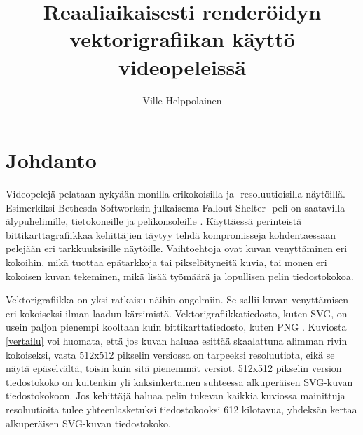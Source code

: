 \documentclass[utf8,bachelor]{gradu3}
\begin{document}
\title{Reaaliaikaisesti renderöidyn vektorigrafiikan käyttö videopeleissä}


\author{Ville Helppolainen}

\maketitle

\mainmatter


\chapter{Johdanto}

Videopelejä pelataan nykyään monilla erikokoisilla ja -resoluutioisilla näytöillä. Esimerkiksi Bethesda Softworksin julkaisema Fallout Shelter -peli on saatavilla älypuhelimille, tietokoneille ja pelikonsoleille \parencite{RefWorks:doc:5bd6d887e4b0a1f99c62e6de}. Käyttäessä perinteistä bittikarttagrafiikkaa kehittäjien täytyy tehdä kompromisseja kohdentaessaan pelejään eri tarkkuuksisille näytöille. Vaihtoehtoja ovat kuvan venyttäminen eri kokoihin, mikä tuottaa epätarkkoja tai pikselöityneitä kuvia, tai monen eri kokoisen kuvan tekeminen, mikä lisää työmäärä ja lopullisen pelin tiedostokokoa. \parencite{RefWorks:doc:5bd8319de4b03ae5c9b276b8}

Vektorigrafiikka on yksi ratkaisu näihin ongelmiin. Se sallii kuvan venyttämisen eri kokoiseksi ilman laadun kärsimistä. Vektorigrafiikkatiedosto, kuten SVG, on usein paljon pienempi kooltaan kuin bittikarttatiedosto, kuten PNG \parencites{RefWorks:doc:5bdc5224e4b05afcfde5b159}{RefWorks:doc:5bdc5292e4b05afcfde5b171}. Kuviosta \ref{vertailu} voi huomata, että jos kuvan haluaa esittää skaalattuna alimman rivin kokoiseksi, vasta 512x512 pikselin versiossa on tarpeeksi resoluutiota, eikä se näytä epäselvältä, toisin kuin sitä pienemmät versiot. 512x512 pikselin version tiedostokoko on kuitenkin yli kaksinkertainen suhteessa alkuperäisen SVG-kuvan tiedostokokoon. Jos kehittäjä haluaa pelin tukevan kaikkia kuviossa mainittuja resoluutioita tulee yhteenlasketuksi tiedostokooksi 612 kilotavua, yhdeksän kertaa alkuperäisen SVG-kuvan tiedostokoko.
\end{document}

